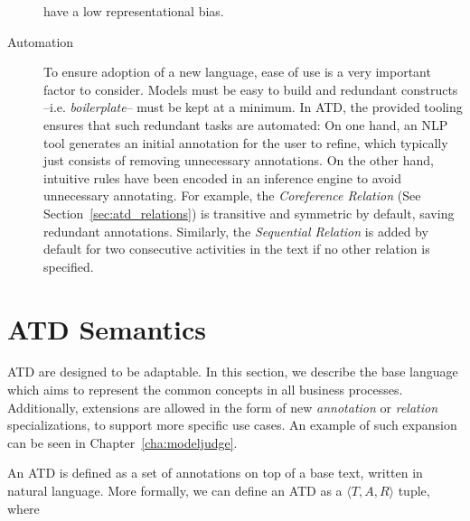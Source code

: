 \begin{description}
{    have a low representational bias.}
\item[Automation]{To ensure adoption of a new language, ease of use is a very
    important factor to consider. Models must be easy to build and redundant
    constructs --i.e. \emph{boilerplate}-- must be kept at a minimum. In ATD, the
    provided tooling ensures that such redundant tasks are automated: On one
    hand, an NLP tool generates an initial annotation for the user to refine,
    which typically just consists of removing unnecessary annotations. On the
    other hand, intuitive rules have been encoded in an inference engine to
    avoid unnecessary annotating. For example, the \emph{Coreference Relation}
    (See Section~\ref{sec:atd_relations}) is transitive and symmetric by
    default, saving redundant annotations. Similarly, the \emph{Sequential
      Relation} is added by default for two consecutive activities in the text
    if no other relation is specified.}
\end{description}



  
%

\section{ATD Semantics}
\label{sec:atd_semantics}

ATD are designed to be adaptable. In this section, we describe the base language
which aims to represent the common concepts in all business processes.
Additionally, extensions are allowed in the form of new \emph{annotation} or
\emph{relation} specializations, to support more specific use cases. An example
of such expansion can be seen in Chapter~\ref{cha:modeljudge}.


An ATD is defined as a set of annotations on top of a base text, written in
natural language. More formally, we can define an ATD as a $\langle T, A, R \rangle$ tuple, where 


